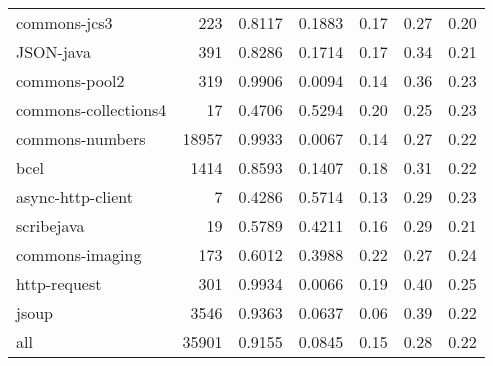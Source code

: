 \begin{table*}
\begin{tabular}{lrrrrrr}
           commons-jcs3 &    223 &          0.8117 &          0.1883 &         0.17 &         0.27 &             0.20 \\
              JSON-java &    391 &          0.8286 &          0.1714 &         0.17 &         0.34 &             0.21 \\
          commons-pool2 &    319 &          0.9906 &          0.0094 &         0.14 &         0.36 &             0.23 \\
   commons-collections4 &     17 &          0.4706 &          0.5294 &         0.20 &         0.25 &             0.23 \\
        commons-numbers &  18957 &          0.9933 &          0.0067 &         0.14 &         0.27 &             0.22 \\
                   bcel &   1414 &          0.8593 &          0.1407 &         0.18 &         0.31 &             0.22 \\
      async-http-client &      7 &          0.4286 &          0.5714 &         0.13 &         0.29 &             0.23 \\
             scribejava &     19 &          0.5789 &          0.4211 &         0.16 &         0.29 &             0.21 \\
        commons-imaging &    173 &          0.6012 &          0.3988 &         0.22 &         0.27 &             0.24 \\
           http-request &    301 &          0.9934 &          0.0066 &         0.19 &         0.40 &             0.25 \\
                  jsoup &   3546 &          0.9363 &          0.0637 &         0.06 &         0.39 &             0.22 \\
                    all &  35901 &          0.9155 &          0.0845 &         0.15 &         0.28 &             0.22 \\
\bottomrule
\end{tabular}
\end{table*}
